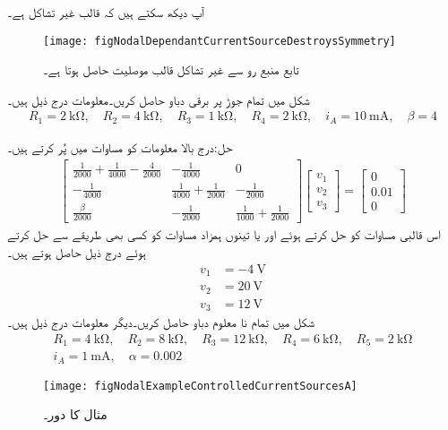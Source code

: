 آپ دیکھ سکتے ہیں کہ  قالب غیر تشاکل ہے۔
\begin{figure}
\centering
\texttt{[image: figNodalDependantCurrentSourceDestroysSymmetry]}
\caption{تابع منبع رو سے غیر تشاکل قالب موصلیت حاصل ہوتا ہے۔}
\label{شکل_جوڑ_تابع_منبع_رو_غیر_تشاکل_قالب}
\end{figure}%
شکل  میں تمام جوڑ پر برقی دباو حاصل کریں۔معلومات درج ذیل ہیں۔
\begin{align*}
R_1=\SI{2}{\kilo\ohm}, \quad R_2=\SI{4}{\kilo\ohm}, \quad R_3=\SI{1}{\kilo\ohm}, \quad R_4=\SI{2}{\kilo\ohm}, \quad i_A=\SI{10}{\milli\ampere}, \quad \beta=4
\end{align*}

حل:درج بالا معلومات کو مساوات  میں پُر کرتے ہیں۔
\begin{align*}
\begin{bmatrix}
\frac{1}{2000}+\frac{1}{4000}-\frac{4}{2000}&-\frac{1}{4000}&0\\
-\frac{1}{4000}&\frac{1}{4000}+\frac{1}{2000}&-\frac{1}{2000}\\
\frac{\beta}{2000}& -\frac{1}{2000}&\frac{1}{1000}+\frac{1}{2000}
\end{bmatrix}
\begin{bmatrix}
v_1\\
v_2\\
v_3
\end{bmatrix}
=
\begin{bmatrix}
0\\
0.01\\
0
\end{bmatrix}
\end{align*}
اس قالبی مساوات کو حل کرتے ہوئے اور یا تینوں ہمزاد مساوات کو کسی بھی طریقے سے حل کرتے ہوئے  درج ذیل حاصل ہوتے ہیں۔
\begin{align*}
v_1&=\SI{-4}{\volt}\\
v_2&=\SI{20}{\volt}\\
v_3&=\SI{12}{\volt}
\end{align*}
شکل  میں تمام نا معلوم دباو حاصل کریں۔دیگر معلومات درج ذیل ہیں۔
\begin{align*}
R_1=\SI{4}{\kilo\ohm}, \quad R_2=\SI{8}{\kilo\ohm}, \quad R_3=\SI{12}{\kilo\ohm},\quad R_4=\SI{6}{\kilo\ohm},\quad R_5=\SI{2}{\kilo\ohm}\\
 i_A=\SI{1}{\milli\ampere},\quad \alpha=0.002
\end{align*}
\begin{figure}[!h]
\centering
\texttt{[image: figNodalExampleControlledCurrentSourcesA]}
\caption{مثال  کا دور۔}
\label{شکل_جوڑ_مثال_مزید}
\end{figure}%


